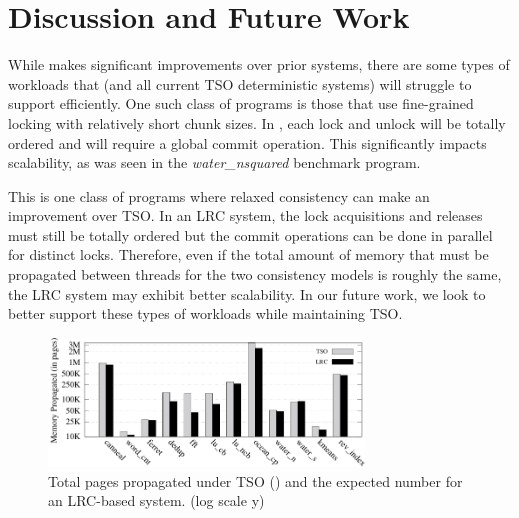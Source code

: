 
\section{Discussion and Future Work}

While \lib{} makes significant improvements over prior systems, there are some types of workloads that \lib{} (and all current TSO deterministic systems) will struggle to support efficiently. One such class of programs is those that use fine-grained locking with relatively short chunk sizes. In \lib{}, each lock and unlock will be totally ordered and will require a global commit operation. This significantly impacts scalability, as was seen in the {\it water\_nsquared} benchmark program. 

This is one class of programs where relaxed consistency can make an improvement over TSO. In an LRC system, the lock acquisitions and releases must still be totally ordered but the commit operations can be done in parallel for distinct locks. Therefore, even if the total amount of memory that must be propagated between threads for the two consistency models is roughly the same, the LRC system may exhibit better scalability. In our future work, we look to better support these types of workloads while maintaining TSO.

\begin{figure}
\includegraphics[width=3.3in]{figures/tso_vs_lrc.pdf}
\caption{Total pages propagated under TSO (\lib{}) and the expected number for an LRC-based system. (log scale y)}
\label{f:tsovslrc}
\end{figure}

